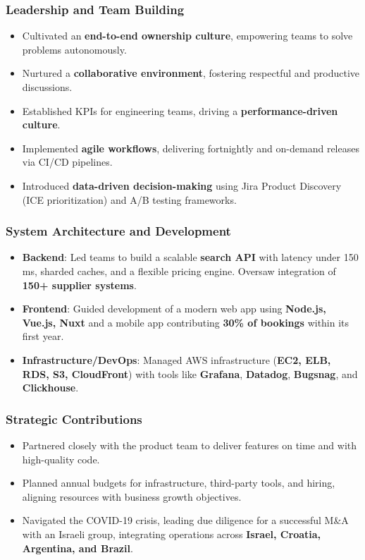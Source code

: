 \documentclass[11pt,a4paper]{article}
\begin{document}
\subsubsection*{Leadership and Team Building}
\begin{itemize}
    \item Cultivated an \textbf{end-to-end ownership culture}, empowering teams to solve problems autonomously.
    \item Nurtured a \textbf{collaborative environment}, fostering respectful and productive discussions.
    \item Established KPIs for engineering teams, driving a \textbf{performance-driven culture}.
    \item Implemented \textbf{agile workflows}, delivering fortnightly and on-demand releases via CI/CD pipelines.
    \item Introduced \textbf{data-driven decision-making} using Jira Product Discovery (ICE prioritization) and A/B testing frameworks.
\end{itemize}

\subsubsection*{System Architecture and Development}
\begin{itemize}
    \item \textbf{Backend}: Led teams to build a scalable \textbf{search API} with latency under 150 ms, sharded caches, and a flexible pricing engine. Oversaw integration of \textbf{150+ supplier systems}.
    \item \textbf{Frontend}: Guided development of a modern web app using \textbf{Node.js, Vue.js, Nuxt} and a mobile app contributing \textbf{30\% of bookings} within its first year.
    \item \textbf{Infrastructure/DevOps}: Managed AWS infrastructure (\textbf{EC2, ELB, RDS, S3, CloudFront}) with tools like \textbf{Grafana}, \textbf{Datadog}, \textbf{Bugsnag}, and \textbf{Clickhouse}.
\end{itemize}

\subsubsection*{Strategic Contributions}
\begin{itemize}
    \item Partnered closely with the product team to deliver features on time and with high-quality code.
    \item Planned annual budgets for infrastructure, third-party tools, and hiring, aligning resources with business growth objectives.
    \item Navigated the COVID-19 crisis, leading due diligence for a successful M\&A with an Israeli group, integrating operations across \textbf{Israel, Croatia, Argentina, and Brazil}.
\end{itemize}
\end{document}
